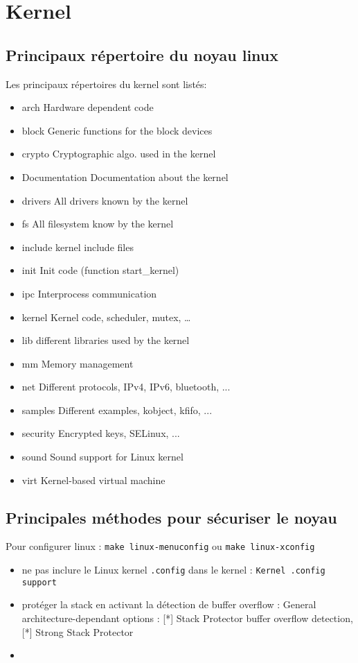 \section{Kernel}
\subsection{Principaux répertoire du noyau linux}
Les principaux répertoires du kernel sont listés:
\begin{itemize}
\item arch Hardware dependent code
\item block Generic functions for the block devices
\item crypto Cryptographic algo. used in the kernel
\item Documentation Documentation about the kernel
\item drivers All drivers known by the kernel
\item fs All filesystem know by the kernel
\item include kernel include files
\item init Init code (function start\_kernel)
\item ipc Interprocess communication
\item kernel Kernel code, scheduler, mutex, … 
\item lib different libraries used by the kernel
\item mm Memory management
\item net Different protocols, IPv4, IPv6, bluetooth, ...
\item samples Different examples, kobject, kfifo, ...
\item security Encrypted keys, SELinux, ...
\item sound Sound support for Linux kernel
\item virt Kernel-based virtual machine
\end{itemize}
\subsection{Principales méthodes pour sécuriser le noyau}
Pour configurer linux : \verb!make linux-menuconfig! ou \verb!make linux-xconfig!
\begin{itemize}
\item ne pas inclure le Linux kernel \verb!.config! dans le kernel : \verb!Kernel .config support!
\item protéger la stack en activant la détection de buffer overflow : General architecture-dependant options : [*] Stack Protector buffer overflow detection, [*] Strong Stack Protector
\item 
\end{itemize}
